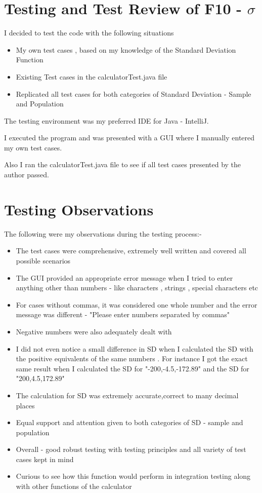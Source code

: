 \documentclass[12pt,letterpaper]{article}
\begin{document}
\section*{Testing and Test Review of F10 - $\sigma$ }

I decided to test the code with the following situations

\begin{itemize}
\item{My own test cases , based on my knowledge of the Standard Deviation Function}
\item{Existing Test cases in the calculatorTest.java file}
\item{Replicated all test cases for both categories of Standard Deviation - Sample and Population}
\end{itemize}


The testing environment was my preferred IDE for Java - IntelliJ.

I executed the program and was presented with a GUI where I manually entered my own test cases.

Also I ran the calculatorTest.java file to see if all test cases presented by the author passed.


\section*{Testing Observations}
The following were my observations during the testing process:- 

\begin{itemize}
\item{The test cases were comprehensive, extremely well written and covered all possible scenarios}
\item{The GUI provided an appropriate error message when I tried to enter anything other than numbers - like characters , strings , special characters etc}
\item{For cases without commas, it was considered one whole number and the error message was different - "Please enter numbers separated by commas"}
\item{Negative numbers were also adequately dealt with}
\item{I did not even notice a small difference in SD when I calculated the SD with the positive equivalents of the same numbers . For instance I got the exact same result when I calculated the SD for "-200,-4.5,-172.89" and the SD for "200,4.5,172.89" }
\item{The calculation for SD was extremely accurate,correct to many decimal places}
\item{Equal support and attention given to both categories of SD - sample and population}
\item{Overall - good robust testing with testing principles and all variety of test cases kept in mind}
\item{Curious to see how this function would perform in integration testing along with other functions of the calculator}
\end{itemize}
\end{document}
